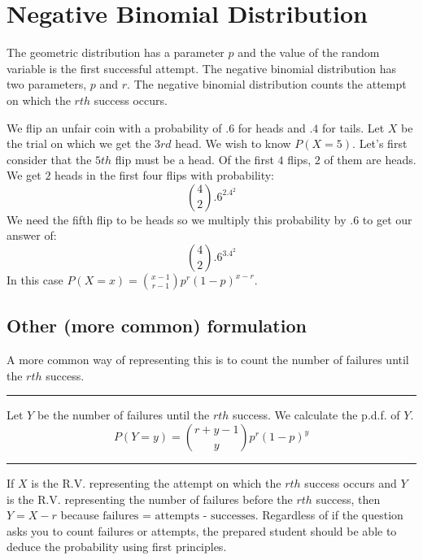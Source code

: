 \documentclass[
]{book}
\theoremstyle{definition}
\theoremstyle{definition}
\theoremstyle{definition}
\theoremstyle{remark}
\let\BeginKnitrBlock\begin \let\EndKnitrBlock\end
\begin{document}
\hypertarget{negative-binomial-distribution}{%
\section{Negative Binomial Distribution}\label{negative-binomial-distribution}}

The geometric distribution has a parameter \(p\) and the value of the random variable is the first successful attempt. The negative binomial distribution has two parameters, \(p\) and \(r\). The negative binomial distribution counts the attempt on which the \(rth\) success occurs.

We flip an unfair coin with a probability of \(.6\) for heads and \(.4\) for tails. Let \(X\) be the trial on which we get the \(3rd\) head. We wish to know \(P(X=5)\). Let's first consider that the \(5th\) flip must be a head. Of the first \(4\) flips, \(2\) of them are heads. We get \(2\) heads in the first four flips with probability:
\[{4 \choose 2}.6^2.4^2\]
We need the fifth flip to be heads so we multiply this probability by \(.6\) to get our answer of:
\[{4 \choose 2}.6^3.4^2\]
In this case \(P(X=x) = {{x-1} \choose {r-1}}p^r(1-p)^{x-r}\).

\hypertarget{other-more-common-formulation}{%
\subsection{Other (more common) formulation}\label{other-more-common-formulation}}

A more common way of representing this is to count the number of failures until the \(rth\) success.

\begin{center}\rule{0.5\linewidth}{0.5pt}\end{center}

\BeginKnitrBlock{definition}[Negative Binomial Distribution]
\protect\hypertarget{def:unnamed-chunk-32}{}{\label{def:unnamed-chunk-32} {} }Let \(Y\) be the number of failures until the \(rth\) success. We calculate the p.d.f. of \(Y\).
\[P(Y=y)={{r+y-1} \choose y}p^r(1-p)^y\]
\EndKnitrBlock{definition}

\begin{center}\rule{0.5\linewidth}{0.5pt}\end{center}

If \(X\) is the R.V. representing the attempt on which the \(rth\) success occurs and \(Y\) is the R.V. representing the number of failures before the \(rth\) success, then \(Y = X - r\) because \(\text{failures = attempts - successes}\). Regardless of if the question asks you to count failures or attempts, the prepared student should be able to deduce the probability using first principles.
\end{document}
